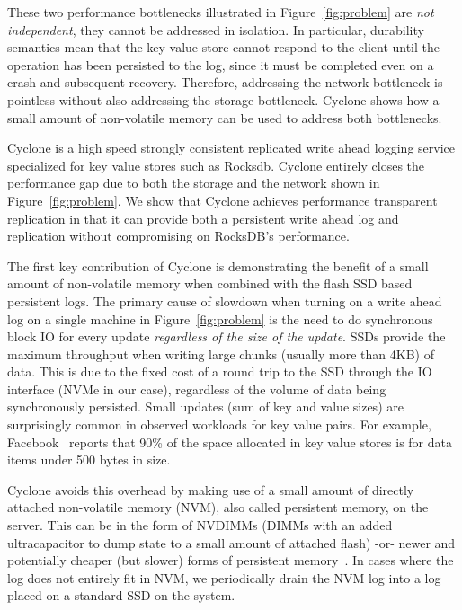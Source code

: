 \documentclass[pageno]{jpaper}
\begin{document}
These two performance bottlenecks illustrated in Figure~\ref{fig:problem} are
\emph{not independent}, they cannot be addressed in isolation. In particular,
durability semantics mean that the key-value store cannot respond to the client
until the operation has been persisted to the log, since it must be completed
even on a crash and subsequent recovery. Therefore, addressing the network
bottleneck is pointless without also addressing the storage bottleneck. Cyclone
shows how a small amount of non-volatile memory can be used to address both
bottlenecks.

Cyclone is a high speed strongly consistent replicated write ahead logging
service specialized for key value stores such as Rocksdb. Cyclone entirely
closes the performance gap due to both the storage and the network shown in
Figure~\ref{fig:problem}. We show that Cyclone achieves performance transparent
replication in that it can provide both a persistent write ahead log and
replication without compromising on RocksDB's performance.

The first key contribution of Cyclone is demonstrating the benefit of a small
amount of non-volatile memory when combined with the flash SSD based persistent
logs.  The primary cause of slowdown when turning on a write ahead log on a
single machine in Figure~\ref{fig:problem} is the need to do synchronous block
IO for every update \emph{regardless of the size of the update}. SSDs provide
the maximum throughput when writing large chunks (usually more than 4KB) of
data. This is due to the fixed cost of a round trip to the SSD through the IO
interface (NVMe in our case), regardless of the volume of data being
synchronously persisted. Small updates (sum of key and value sizes) are
surprisingly common in observed workloads for key value pairs. For example,
Facebook~\cite{fb_workload_analysis} reports that 90\% of the space allocated in
key value stores is for data items under 500 bytes in size.

Cyclone avoids this overhead by making use of a small amount of directly
attached non-volatile memory (NVM), also called persistent memory, on the
server.  This can be in the form of NVDIMMs (DIMMs with an added ultracapacitor
to dump state to a small amount of attached flash) -or- newer and potentially
cheaper (but slower) forms of persistent memory~\cite{pmfs}.
In cases where the log does not entirely fit in NVM, we periodically drain the
NVM log into a log placed on a standard SSD on the system.
\end{document}
